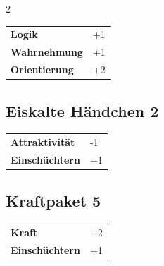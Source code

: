 \begin{multicols}{2}
\begin{tcolorbox}
\begin{tabular}{@{}ll@{}}
    \textbf{Logik} & +1\\
    \textbf{Wahrnehmung} & +1\\
    \textbf{Orientierung} & +2\\
\end{tabular}


\end{tcolorbox}

\begin{tcolorbox}
    \subsection*{Eiskalte Händchen \hfill \small{2 }}
    \tcblower




\begin{tabular}{@{}ll@{}}
    \textbf{Attraktivität} & -1\\
    \textbf{Einschüchtern} & +1\\
\end{tabular}


\end{tcolorbox}

\begin{tcolorbox}
    \subsection*{Kraftpaket \hfill \small{5 }}
    \tcblower




\begin{tabular}{@{}ll@{}}
    \textbf{Kraft} & +2\\
    \textbf{Einschüchtern} & +1\\
\end{tabular}


\end{tcolorbox}


\end{multicols}

